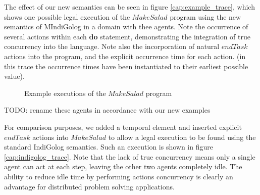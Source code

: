 The effect of our new semantics can be seen in figure \ref{cap:example_trace},
which shows one possible legal execution of the $MakeSalad$ program
using the new semantics of MIndiGolog in a domain with thee agents.
Note the occurrence of several actions within each \textbf{do} statement,
demonstrating the integration of true concurrency into the language.
Note also the incorporation of natural $endTask$ actions into the
program, and the explicit occurrence time for each action. (in this
trace the occurrence times have been instantiated to their earliest
possible value).

%
\begin{figure*}[t]
 \centering {} 

\caption{Example executions of the $MakeSalad$ program}

\end{figure*}


TODO: rename these agents in accordance with our new examples

For comparison purposes, we added a temporal element and inserted
explicit $endTask$ actions into $MakeSalad$ to allow a legal execution
to be found using the standard IndiGolog semantics. Such an execution
is shown in figure \ref{cap:indigolog_trace}. Note that the lack
of true concurrency means only a single agent can act at each step,
leaving the other two agents completely idle. The ability to reduce
idle time by performing actions concurrency is clearly an advantage
for distributed problem solving applications.


